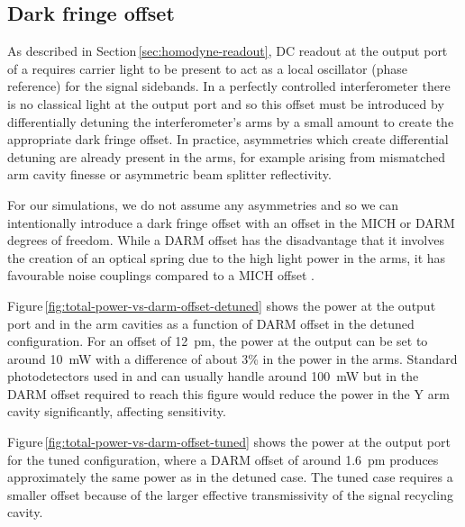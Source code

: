 \subsection{Dark fringe offset}
As described in Section\,\ref{sec:homodyne-readout}, \gls{DC} readout at the output port of a \DRFPMI{} requires carrier light to be present to act as a local oscillator (phase reference) for the signal sidebands. In a perfectly controlled interferometer there is no classical light at the output port and so this offset must be introduced by differentially detuning the interferometer's arms by a small amount to create the appropriate dark fringe offset. In practice, asymmetries which create differential detuning are already present in the arms, for example arising from mismatched arm cavity finesse or asymmetric beam splitter reflectivity.

For our simulations, we do not assume any asymmetries and so we can intentionally introduce a dark fringe offset with an offset in the \gls{MICH} or \gls{DARM} degrees of freedom. While a \gls{DARM} offset has the disadvantage that it involves the creation of an optical spring due to the high light power in the arms, it has favourable noise couplings compared to a \gls{MICH} offset \cite{Vajente2011}.

Figure\,\ref{fig:total-power-vs-darm-offset-detuned} shows the power at the output port and in the arm cavities as a function of \gls{DARM} offset in the detuned configuration. For an offset of \SI{12}{\pico\meter}, the power at the output can be set to around \SI{10}{\milli\watt} with a difference of about 3\% in the power in the arms. Standard photodetectors used in \ALIGO{} and \AVIRGO{} can usually handle around \SI{100}{\milli\watt} but in \ETLF{} the \gls{DARM} offset required to reach this figure would reduce the power in the Y arm cavity significantly, affecting sensitivity.

Figure\,\ref{fig:total-power-vs-darm-offset-tuned} shows the power at the output port for the tuned configuration, where a \gls{DARM} offset of around \SI{1.6}{\pico\meter} produces approximately the same power as in the detuned case. The tuned case requires a smaller offset because of the larger effective transmissivity of the signal recycling cavity.

